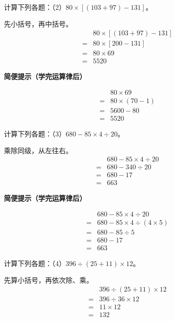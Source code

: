 计算下列各题：（2）\(80\times[(103+97)-131]\)。\par
\begin{BookAnswer}
先小括号，再中括号。\[\begin{aligned} &80\times[(103+97)-131]\\={}&80\times[200-131]\\={}&80\times69\\={}&5520\end{aligned}\]\par\textbf{简便提示（学完运算律后）}\par \[\begin{aligned}&80\times69\\={}&80\times(70-1)\\={}&5600-80\\={}&5520\end{aligned}\]
\end{BookAnswer}

计算下列各题：（3）\(680-85\times4\div20\)。\par
\begin{BookAnswer}
乘除同级，从左往右。\[\begin{aligned} &680-85\times4\div20\\={}&680-340\div20\\={}&680-17\\={}&663\end{aligned}\]\par\textbf{简便提示（学完运算律后）}\par \[\begin{aligned}&680-85\times4\div20\\={}&680-85\times4\div(4\times5)\\={}&680-85\div5\\={}&680-17\\={}&663\end{aligned}\]
\end{BookAnswer}

计算下列各题：（4）\(396\div(25+11)\times12\)。\par
\begin{BookAnswer}
先算小括号，再依次除、乘。\[\begin{aligned} &396\div(25+11)\times12\\={}&396\div36\times12\\={}&11\times12\\={}&132\end{aligned}\]
\end{BookAnswer}

